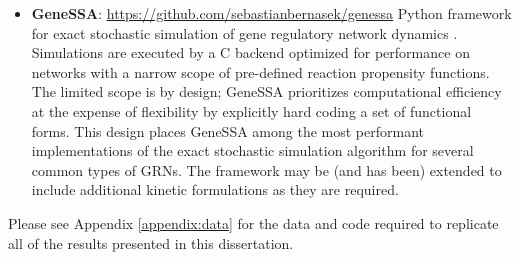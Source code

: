 \begin{itemize}[leftmargin=*,topsep=10pt, itemsep=10pt]
  \item \textbf{GeneSSA}: \url{https://github.com/sebastianbernasek/genessa}
  \newline
  Python framework for exact stochastic simulation of gene regulatory network dynamics \cite{Gillespie1977}. Simulations are executed by a C backend optimized for performance on networks with a narrow scope of pre-defined reaction propensity functions. The limited scope is by design; GeneSSA prioritizes computational efficiency at the expense of flexibility by explicitly hard coding a set of functional forms. This design places GeneSSA among the most performant implementations of the exact stochastic simulation algorithm for several common types of GRNs. The framework may be (and has been) extended to include additional kinetic formulations as they are required.
  
\end{itemize}

Please see Appendix \ref{appendix:data} for the data and code required to replicate all of the results presented in this dissertation.
